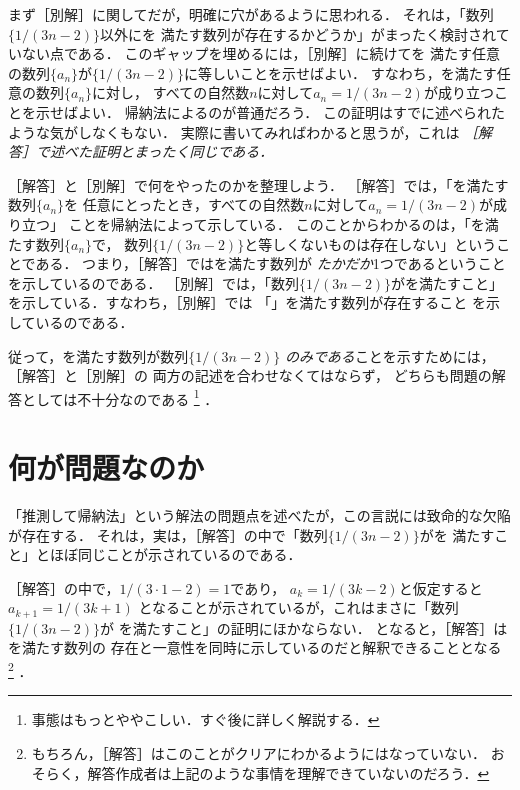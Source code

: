 \documentclass[11pt,a4paper]{ltjsarticle} %
\theoremstyle{mystyle} %
\begin{document}
 
まず［別解］に関してだが，明確に穴があるように思われる．
それは，「数列$\{ 1/(3n-2) \}$以外にを
満たす数列が存在するかどうか」がまったく検討されていない点である．
このギャップを埋めるには，［別解］に続けてを
満たす任意の数列$\{ a_n \}$が$\{ 1/(3n-2) \}$に等しいことを示せばよい．
すなわち，を満たす任意の数列$\{a_n \}$に対し，
すべての自然数$n$に対して$a_n = 1/(3n-2)$が成り立つことを示せばよい．
帰納法によるのが普通だろう．
この証明はすでに述べられたような気がしなくもない．
実際に書いてみればわかると思うが，これは
\emph{［解答］で述べた証明とまったく同じである．}


［解答］と［別解］で何をやったのかを整理しよう．
［解答］では，「を満たす数列$\{ a_n \}$を
任意にとったとき，すべての自然数$n$に対して$a_n = 1/(3n-2)$が成り立つ」
ことを帰納法によって示している．
このことからわかるのは，「を満たす数列$\{ a_n \}$で，
数列$\{ 1/(3n-2) \}$と等しくないものは存在しない」ということである．
つまり，［解答］ではを満たす数列が
\emph{たかだか}1つであるということを示しているのである．
［別解］では，「数列$\{ 1/(3n-2) \}$がを満たすこと」
を示している．すなわち，［別解］では
「」を満たす数列が存在すること
を示しているのである．

従って，を満たす数列が数列$\{ 1/(3n-2) \}$
\emph{のみである}ことを示すためには，［解答］と［別解］の
両方の記述を合わせなくてはならず，
どちらも問題の解答としては不十分なのである
\footnote{
  事態はもっとややこしい．すぐ後に詳しく解説する．
}
．


\section{何が問題なのか}
「推測して帰納法」という解法の問題点を述べたが，この言説には致命的な欠陥が存在する．
それは，実は，［解答］の中で「数列$\{ 1/(3n-2) \}$がを
満たすこと」とほぼ同じことが示されているのである．

［解答］の中で，$1/(3 \cdot 1 -2) =1$であり，
$a_k = 1/(3k-2)$と仮定すると$a_{k+1} = 1/(3k+1)$
となることが示されているが，これはまさに「数列$\{ 1/(3n-2) \}$が
を満たすこと」の証明にほかならない．
となると，［解答］はを満たす数列の
存在と一意性を同時に示しているのだと解釈できることとなる
\footnote{
  もちろん，［解答］はこのことがクリアにわかるようにはなっていない．
  おそらく，解答作成者は上記のような事情を理解できていないのだろう．
}
．
\end{document}
